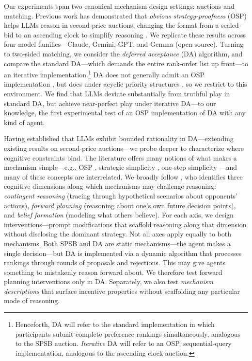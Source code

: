 \documentclass[format=acmsmall, review=false]{acmart}
\begin{document}
Our experiments span two canonical mechanism design settings: auctions and matching. Previous work has demonstrated that {\em obvious strategy-proofness} (OSP) helps LLMs reason in second-price auctions, changing the format from a sealed-bid to an ascending clock to simplify reasoning \citep{zhu2024evidence}. We replicate these results across four model families---Claude, Gemini, GPT, and Gemma (open-source). Turning to two-sided matching, we consider the {\em deferred acceptance} (DA) algorithm, and compare the standard DA---which demands the entire rank-order list up front---to an iterative implementation.\footnote{Henceforth, DA will refer to the standard implementation in which participants submit complete preference rankings simultaneously, analogous to the SPSB auction. {\em Iterative} DA will refer to an OSP, sequential-query implementation, analogous to the ascending clock auction.} DA does not generally admit an OSP implementation \citep{ashlagi2018stable}, but does under acyclic priority structures \citep{ergin2002efficient}, so we restrict to this environment. We find that LLMs deviate substantially from truthful play in standard DA, but achieve near-perfect play under iterative DA---to our knowledge, the first experimental test of an OSP implementation of DA with any kind of agent.

Having established that LLMs exhibit bounded rationality in DA---extending existing results on second-price auctions---we probe deeper to characterize where cognitive constraints bind. The literature offers many notions of what makes a mechanism simple---e.g., OSP \citep{li2017obviously}, strategic simplicity \citep{borgers2019strategically}, one-step simplicity \citep{pycia2023theory}---and many of these concepts are interrelated. We broadly follow \citet{li2024designing}, who identifies three cognitive dimensions along which mechanisms may challenge reasoning: {\em contingent reasoning} (tracing through hypothetical scenarios about opponents' actions), {\em forward planning} (reasoning about one's own future decision points), and {\em belief formation} (modeling what others believe). For each axis, we design interventions---prompt modifications that scaffold reasoning along that dimension without disclosing the dominant strategy. Not all axes apply equally to both mechanisms. Both SPSB and DA are static mechanisms---the agent makes a single decision---but DA is implemented via a dynamic algorithm that processes rankings through rounds of proposals and rejections. This may give agents something to mistakenly reason forward about. We therefore test forward planning interventions only in DA. Separately, we also test {\em mechanism descriptions} that surface incentive properties without scaffolding any particular mode of reasoning.
\end{document}
